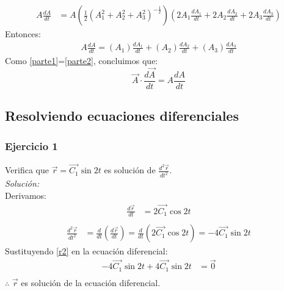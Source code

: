 \documentclass[12pt,openany]{book}
\begin{document}
				\begin{equation*}
					\begin{split}
						A\frac{dA}{dt}&=A\left(\frac{1}{2}(A_{1}^{2}+A_{2}^{2}+A_{3}^{2})^{-\frac{1}{2}}\right)
										\left(2A_{1}\frac{dA_{1}}{dt}+2A_{2}\frac{dA_{2}}{dt}+2A_{3}\frac{dA_{3}}{dt}\right)
					\end{split}
				\end{equation*}
				Entonces:
				\begin{equation}
					\begin{split}
					A\frac{dA}{dt}=(A_{1})\frac{dA_{1}}{dt}+(A_{2})\frac{dA_{2}}{dt}
													+(A_{3})\frac{dA_{3}}{dt}
					\end{split}
					\label{parte2}
				\end{equation}
				Como \ref{parte1}=\ref{parte2}, concluimos que:
				$$
					\vec{A}\cdot\frac{d\vec{A}}{dt}=A\frac{dA}{dt}
				$$
	
		\subsection{Resolviendo ecuaciones diferenciales}
			
			\subsubsection{Ejercicio 1}
				\noindent Verifica que $\vec{r}=\vec{C_{1}}\sin2t$ es soluci\'on de $\frac{d^{2}\vec{r}}{dt^{2}}$.	\\
				\noindent\textsl{Soluci\'on:}\\
				Derivamos:
				\begin{equation*}
					\begin{split}
						\frac{d\vec{r}}{dt}&=2\vec{C_{1}}\cos2t	\\
					\end{split}
				\end{equation*}
				\begin{equation}
					\begin{split}
						\frac{d^{2}\vec{r}}{dt^{2}}&=\frac{d}{dt}\left(\frac{d\vec{r}}{dt}\right)	
												   =\frac{d}{dt}\left(2\vec{C_{1}}\cos2t\right)	
												   =-4\vec{C_{1}}\sin2t
					\end{split}
					\label{r2}
				\end{equation}
				Sustituyendo \ref{r2} en la ecuaci\'on diferencial:
				\begin{equation*}
					\begin{split}
						-4\vec{C_{1}}\sin2t+4\vec{C_{1}}\sin2t&=\vec{0} \\
					\end{split}
				\end{equation*}
				$\therefore$  $\vec{r}$ es soluci\'on de la ecuaci\'on diferencial.
\end{document}
